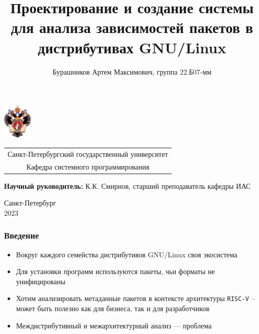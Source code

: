 \documentclass{beamer}
\title[Метаданные пакетов в Linux]{Проектирование и создание системы для анализа зависимостей пакетов в дистрибутивах GNU/Linux}
\institute[СПбГУ]{}
\author[Бурашников Артем]{Бурашников Артем Максимович, группа 22.Б07-мм}
\begin{document}
{
\begin{frame}
	\includegraphics[width=1.4cm]{pictures/SPbGU_Logo.png}
	\vspace{-35pt}
	\hspace{-10pt}
	\begin{center}
		\begin{tabular}{c}
			\scriptsize{Санкт-Петербургский государственный университет} \\
			\scriptsize{Кафедра системного программирования}
		\end{tabular}
		\titlepage
	\end{center}

	\btVFill

	{\scriptsize
		\textbf{Научный руководитель:} К.К. Смирнов, старший преподаватель кафедры ИАС \\
	}
	\begin{center}
		\vspace{5pt}
		\scriptsize{Санкт-Петербург\\
			2023}
	\end{center}

\end{frame}
}

\begin{frame}[fragile]
	\frametitle{Введение}
	\begin{itemize}
		\item Вокруг каждого семейства дистрибутивов GNU/Linux своя экосистема
		\item Для установки программ используются пакеты, чьи форматы не унифицированы
		\item Хотим анализировать метаданные пакетов в контексте архитектуры \texttt{RISC-V} -- может быть полезно как для бизнеса, так и для разработчиков
		\item Междистрибутивный и межархитектурный анализ --- проблема
	\end{itemize}
\end{frame}
\end{document}
